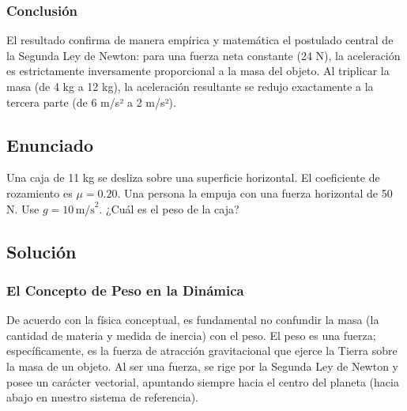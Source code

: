 \documentclass[12pt]{article}
\begin{document}
\subsubsection*{Conclusión}
El resultado confirma de manera empírica y matemática el postulado central de la Segunda Ley de Newton: para una fuerza neta constante (24 N), la aceleración es estrictamente inversamente proporcional a la masa del objeto. Al triplicar la masa (de 4 kg a 12 kg), la aceleración resultante se redujo exactamente a la tercera parte (de 6 m/s² a 2 m/s²).

\newpage

\subsection*{Enunciado}
Una caja de 11 kg se desliza sobre una superficie horizontal. El coeficiente de rozamiento es $\mu = 0.20$. Una persona la empuja con una fuerza horizontal de 50 N. Use $g = 10 \, \text{m/s}^2$. ¿Cuál es el peso de la caja?

\begin{center}
\end{center}

\subsection*{Solución}

\subsubsection*{El Concepto de Peso en la Dinámica}
De acuerdo con la física conceptual, es fundamental no confundir la masa (la cantidad de materia y medida de inercia) con el peso. El peso es una fuerza; específicamente, es la fuerza de atracción gravitacional que ejerce la Tierra sobre la masa de un objeto. Al ser una fuerza, se rige por la Segunda Ley de Newton y posee un carácter vectorial, apuntando siempre hacia el centro del planeta (hacia abajo en nuestro sistema de referencia).
\end{document}
